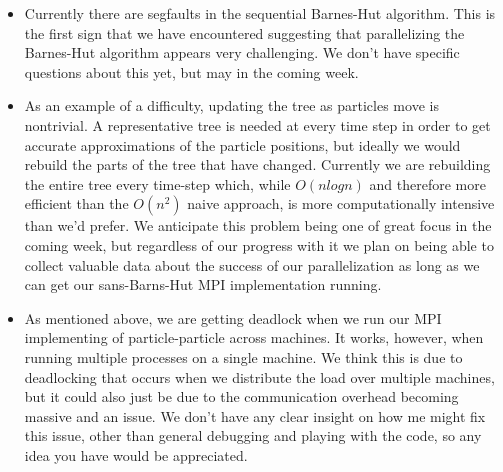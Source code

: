 \documentclass[11pt]{article}
\begin{document}
\begin{itemize}
    \item Currently there are segfaults in the sequential Barnes-Hut algorithm. This is the first sign that we have encountered suggesting that parallelizing the Barnes-Hut algorithm appears very challenging. We don't have specific questions about this yet, but may in the coming week. 
    \item As an example of a difficulty, updating the tree as particles move is nontrivial. A representative tree is needed at every time step in order to get accurate approximations of the particle positions, but ideally we would rebuild the parts of the tree that have changed. Currently we are rebuilding the entire tree every time-step which, while $O(nlogn)$ and therefore more efficient than the $O(n^2)$ naive approach, is more computationally intensive than we'd prefer. We anticipate this problem being one of great focus in the coming week, but regardless of our progress with it we plan on being able to collect valuable data about the success of our parallelization as long as we can get our sans-Barns-Hut MPI implementation running.
    \item As mentioned above, we are getting deadlock when we run our MPI implementing of particle-particle across machines. It works, however, when running multiple processes on a single machine. We think this is due to deadlocking that occurs when we distribute the load over multiple machines, but it could also just be due to the communication overhead becoming massive and an issue. We don't have any clear insight on how me might fix this issue, other than general debugging and playing with the code, so any idea you have would be appreciated.
\end{itemize}
\end{document}
